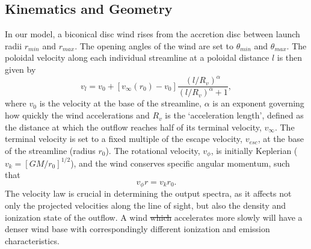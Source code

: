 \documentclass[useAMS,usenatbib]{mn2e_x}
\providecommand{\DIFadd}[1]{{\protect\color{blue}\uwave{#1}}} %
\providecommand{\DIFdel}[1]{{\protect\color{red}\sout{#1}}}                      %
\providecommand{\DIFaddbegin}{} %
\providecommand{\DIFaddend}{} %
\providecommand{\DIFdelbegin}{} %
\providecommand{\DIFdelend}{} %
\begin{document}



\DIFdelend \subsection{Kinematics and Geometry}

In our model, a biconical disc wind rises from the accretion 
disc between launch radii $r_{min}$ and $r_{max}$.
The opening angles of the wind are set to $\theta_{min}$ and $\theta_{max}$.
The poloidal velocity along each individual streamline at a poloidal distance $l$ 
is then given by
\begin{equation}
v_l=v_0+\left[v_{\infty}(r_0)-v_0\right]\frac{\left(l/R_v\right)^{\alpha}}{\left(l/R_v\right)^{\alpha}+1},
\label{v_law}
\end{equation}
where $v_0$ is the velocity at the base of the streamline, $\alpha$ is
an exponent governing how quickly the wind accelerations and 
$R_v$ is the `acceleration length', defined as the distance at which
the outflow reaches half of its terminal velocity, $v_{\infty}$.
The terminal velocity is set to a fixed multiple of the escape
velocity, $v_{esc}$, at the base of the streamline (radius $r_0$).
The rotational velocity, $v_{\phi}$, is initially Keplerian ($v_k = [GM/r_0]^{1/2}$),
and the wind conserves specific angular momentum, such that 
\begin{equation}
v_{\phi} r = v_k r_0.
\label{v_law}
\end{equation}
The velocity law is crucial in determining the output spectra,
as it affects not only the projected velocities along the line of sight,
but also the density and ionization state of the outflow.
A wind \DIFdelbegin \DIFdel{which }\DIFdelend \DIFaddbegin \DIFadd{that }\DIFaddend accelerates more slowly will have a denser wind base
with correspondingly different ionization and emission characteristics.
\end{document}
